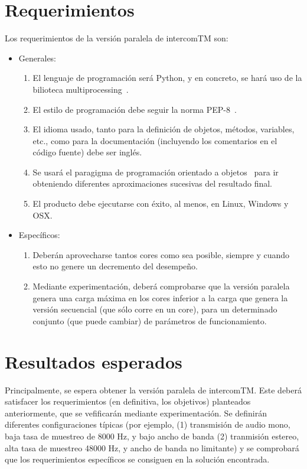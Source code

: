 \documentclass[titlepage, 12pt, a4paper, oneside]{article}
\begin{document}
\section{Requerimientos}
\label{sec:requerimientos}
Los requerimientos de la versión paralela de intercomTM son:

\begin{itemize}
\item Generales:
  \begin{enumerate}
  \item El lenguaje de programación será Python, y en concreto, se
    hará uso de la bilioteca multiprocessing~\cite{multiprocessing}.    
  \item El estilo de programación debe seguir la norma
    PEP-8~\cite{PEP8}.
  \item El idioma usado, tanto para la definición de objetos, métodos,
    variables, etc., como para la documentación (incluyendo los
    comentarios en el código fuente) debe ser inglés.
  \item Se usará el paragigma de programación orientado a
    objetos~\cite{schach2008object} para ir obteniendo diferentes
    aproximaciones sucesivas del resultado final.
  \item El producto debe ejecutarse con éxito, al menos, en Linux,
    Windows y OSX.
  \end{enumerate}
\item Específicos:
  \begin{enumerate}
  \item Deberán aprovecharse tantos cores como sea posible, siempre y
    cuando esto no genere un decremento del desempeño.
  \item Mediante experimentación, deberá comprobarse que la versión
    paralela genera una carga máxima en los cores inferior a la carga
    que genera la versión secuencial (que sólo corre en un core), para
    un determinado conjunto (que puede cambiar) de parámetros de
    funcionamiento.
  \end{enumerate}
\end{itemize}

\section{Resultados esperados}
\label{sec:resultados}
Principalmente, se espera obtener la versión paralela de intercomTM.
Este deberá satisfacer los requerimientos (en definitiva, los
objetivos) planteados anteriormente, que se vefificarán mediante
experimentación.  Se definirán diferentes configuraciones típicas (por
ejemplo, (1) transmisión de audio mono, baja tasa de muestreo de 8000
Hz, y bajo ancho de banda (2) tranmisión estereo, alta tasa de
muestreo 48000 Hz, y ancho de banda no limitante) y se comprobará que
los requerimientos específicos se consiguen en la solución encontrada.
\end{document}

